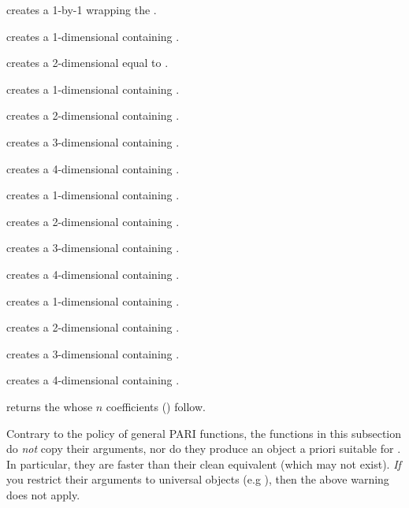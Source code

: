  creates a 1-by-1  wrapping the 
.

 creates a 1-dimensional  containing
.

 creates a 2-dimensional  equal
to \kbd{[x,y]}.

 creates a 1-dimensional 
containing .

 creates a 2-dimensional 
containing .

 creates a 3-dimensional 
containing .

 creates a 4-dimensional
 containing .

 creates a 1-dimensional 
containing .

 creates a 2-dimensional 
containing .

 creates a 3-dimensional 
containing .

 creates a 4-dimensional
 containing .

 creates a 1-dimensional 
containing .

 creates a 2-dimensional 
containing \kbd{[x, y]}.

 creates a 3-dimensional
 containing \kbd{[x, y, z]}.

 creates a 4-dimensional
 containing \kbd{[x, y, z, t]}.

 returns the  whose $n$
coefficients () follow.

\label{se:unclean}

Contrary to the policy of general PARI functions, the functions in this
subsection do \emph{not} copy their arguments, nor do they produce an object
a priori suitable for . In particular, they are
faster than their clean equivalent (which may not exist). \emph{If} you
restrict their arguments to universal objects (e.g ),
then the above warning does not apply.

